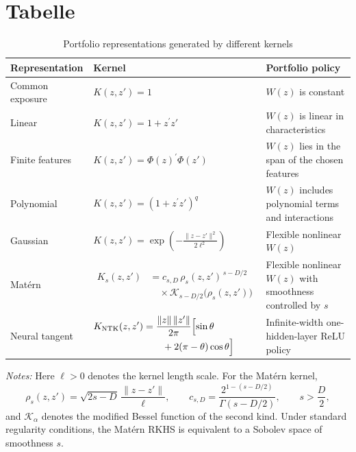 \section{Tabelle}
\begin{table}[H]
\centering
\caption{Portfolio representations generated by different kernels}
\label{tab:kernel_policy_classes}
\small
\renewcommand{\arraystretch}{1.25}

\begin{tabular}{
p{}
p{}
p{}
}
\toprule
Representation & Kernel & Portfolio policy\\
\midrule

Common exposure
&
$K(z,z')=1$
&
$W(z)$ is constant
\\[4pt]

Linear
&
$K(z,z')=1+z^\prime z'$
&
$W(z)$ is linear in characteristics
\\[4pt]

Finite features
&
$K(z,z')=\Phi(z)^\prime\Phi(z')$
&
$W(z)$ lies in the span of the chosen features
\\[4pt]

Polynomial
&
$K(z,z')=(1+z^\prime z')^q$
&
$W(z)$ includes polynomial terms and interactions
\\[6pt]

Gaussian
&
$\displaystyle
K(z,z')
=
\exp\!\left(
-\frac{\|z-z'\|^2}{2\ell^2}
\right)$
&
Flexible nonlinear $W(z)$
\\[8pt]

Mat\'ern
&
$\displaystyle
\begin{aligned}
K_s(z,z')
&=
c_{s,D}\,
\rho_s(z,z')^{\,s-D/2}
\\[-1pt]
&\quad\times
\mathcal K_{s-D/2}
\!\bigl(\rho_s(z,z')\bigr)
\end{aligned}$
&
Flexible nonlinear $W(z)$ with smoothness controlled by $s$
\\[10pt]

Neural tangent
&
$\displaystyle
\begin{aligned}
K_{\mathrm{NTK}}(z,z')
&=
\frac{\|z\|\,\|z'\|}{2\pi}
\Bigl[\sin\theta
\\[-1pt]
&\qquad
+2(\pi-\theta)\cos\theta
\Bigr]
\end{aligned}$
&
Infinite-width one-hidden-layer ReLU policy
\\

\bottomrule
\end{tabular}

\begin{minipage}{0.97\textwidth}
\footnotesize
\emph{Notes:}
Here $\ell>0$ denotes the kernel length scale. For the Mat\'ern kernel,
\[
\rho_s(z,z')
=
\sqrt{2s-D}\,
\frac{\|z-z'\|}{\ell},
\qquad
c_{s,D}
=
\frac{2^{1-(s-D/2)}}{\Gamma(s-D/2)},
\qquad
s>\frac{D}{2},
\]
and $\mathcal K_\alpha$ denotes the modified Bessel function of the second kind.
Under standard regularity conditions, the Mat\'ern RKHS is equivalent to a
Sobolev space of smoothness $s$.


\end{minipage}
\end{table}
